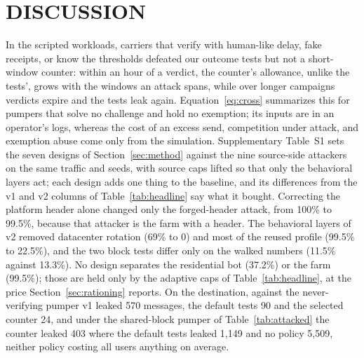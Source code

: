 \documentclass{IEEEoj}
\begin{document}
\section{DISCUSSION}
\label{sec:discussion}

In the scripted workloads, carriers that verify with human-like delay, fake receipts, or know the thresholds defeated our outcome tests but not a short-window counter: within an hour of a verdict, the counter's allowance, unlike the tests', grows with the windows an attack spans, while over longer campaigns verdicts expire and the tests leak again. Equation~\eqref{eq:cross} summarizes this for pumpers that solve no challenge and hold no exemption; its inputs are in an operator's logs, whereas the cost of an excess send, competition under attack, and exemption abuse come only from the simulation. Supplementary Table~S1 sets the seven designs of Section~\ref{sec:method} against the nine source-side attackers on the same traffic and seeds, with source caps lifted so that only the behavioral layers act; each design adds one thing to the baseline, and its differences from the v1 and v2 columns of Table~\ref{tab:headline} say what it bought. Correcting the platform header alone changed only the forged-header attack, from 100\% to 99.5\%, because that attacker is the farm with a header. The behavioral layers of v2 removed datacenter rotation (69\% to 0) and most of the reused profile (99.5\% to 22.5\%), and the two block tests differ only on the walked numbers (11.5\% against 13.3\%). No design separates the residential bot (37.2\%) or the farm (99.5\%); those are held only by the adaptive caps of Table~\ref{tab:headline}, at the price Section~\ref{sec:rationing} reports. On the destination, against the never-verifying pumper v1 leaked 570 messages, the default tests 90 and the selected counter 24, and under the shared-block pumper of Table~\ref{tab:attacked} the counter leaked 403 where the default tests leaked 1,149 and no policy 5,509, neither policy costing all users anything on average.
\end{document}
